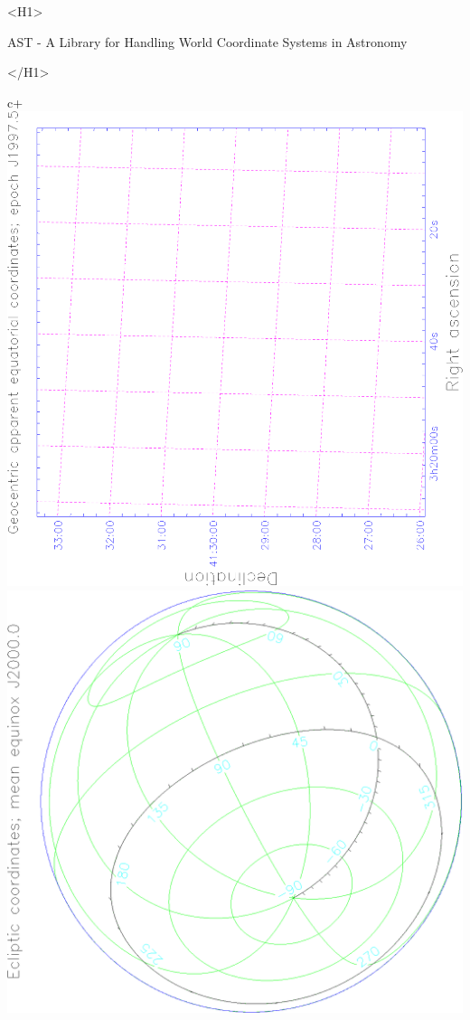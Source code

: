 \documentclass[twoside,11pt]{article}
\newcommand{\stardoctitlehtml} {AST - A Library for Handling World Coordinate
                                      Systems in Astronomy}
\newcommand{\xlabel}[1]{}
\begin{document}
\begin{htmlonly}
   \xlabel{}
   \begin{rawhtml} <H1> \end{rawhtml}
      \stardoctitlehtml
   \begin{rawhtml} </H1> \end{rawhtml}

c+
   \includegraphics[scale=0.3,angle=-90]{sun211_figures/fronta.eps}\hfill
   \includegraphics[scale=0.3,angle=-90]{sun211_figures/frontb.eps}\hfill

\end{htmlonly}
\end{document}
